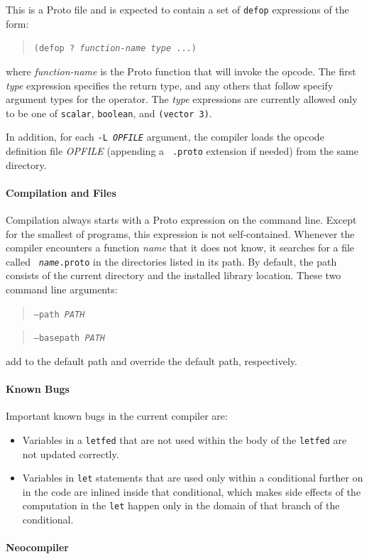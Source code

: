 \documentclass{article}
\newcommand\code[1]{\begin{quote}\var{#1}\end{quote}}
\newcommand\var[1]{{\tt #1}}
\begin{document}
This is a Proto file and is expected to contain a set of \var{defop}
expressions of the form: \code{(defop ? {\it function-name} {\it type}
  ...)}  where {\it function-name} is the Proto function that will
invoke the opcode.  The first {\it type} expression specifies the
return type, and any others that follow specify argument types for the
operator.  The {\it type} expressions are currently allowed only to be
one of \var{scalar}, \var{boolean}, and \var{(vector 3)}.

In addition, for each \var{-L {\it OPFILE}} argument, the compiler
loads the opcode definition file {\it OPFILE} (appending a {\tt
  .proto} extension if needed) from the same directory.

\paragraph{Compilation and Files}

Compilation always starts with a Proto expression on the command line.
Except for the smallest of programs, this expression is not
self-contained.  Whenever the compiler encounters a function {\it
  name} that it does not know, it searches for a file called \var{{\it
    name}.proto} in the directories listed in its path.  By default,
the path consists of the current directory and the installed library
location.  These two command line arguments: \code{--path {\it PATH}}
\code{--basepath {\it PATH}} add to the default path and override the
default path, respectively.

\paragraph{Known Bugs}
Important known bugs in the current compiler are:
\begin{itemize}
\item Variables in a \var{letfed} that are not used within the body
  of the \var{letfed} are not updated correctly.
\item Variables in \var{let} statements that are used only within a
  conditional further on in the code are inlined inside that
  conditional, which makes side effects of the computation in the
  \var{let} happen only in the domain of that branch of the
  conditional.
\end{itemize}

\paragraph{Neocompiler}
\end{document}
